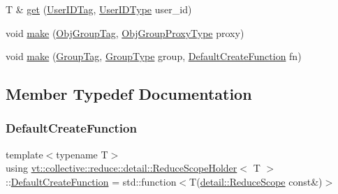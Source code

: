 \begin{DoxyCompactItemize}
\item 
T \& \hyperlink{structvt_1_1collective_1_1reduce_1_1detail_1_1_reduce_scope_holder_a2413b5fd1fbd0b87b09d81240000e5f8}{get} (\hyperlink{structvt_1_1collective_1_1reduce_1_1detail_1_1_reduce_scope_holder_1_1_user_i_d_tag}{User\+I\+D\+Tag}, \hyperlink{namespacevt_1_1collective_1_1reduce_1_1detail_ae82d7b96b0885b9b7dfb0104398beead}{User\+I\+D\+Type} user\+\_\+id)
\item 
void \hyperlink{structvt_1_1collective_1_1reduce_1_1detail_1_1_reduce_scope_holder_a0226c973a9bc67754fe5ce3076cb077e}{make} (\hyperlink{structvt_1_1collective_1_1reduce_1_1detail_1_1_reduce_scope_holder_1_1_obj_group_tag}{Obj\+Group\+Tag}, \hyperlink{namespacevt_ad7cae989df485fccca57f0792a880a8e}{Obj\+Group\+Proxy\+Type} proxy)
\item 
void \hyperlink{structvt_1_1collective_1_1reduce_1_1detail_1_1_reduce_scope_holder_a47ef025fc658370a2d42680f7c006abb}{make} (\hyperlink{structvt_1_1collective_1_1reduce_1_1detail_1_1_reduce_scope_holder_1_1_group_tag}{Group\+Tag}, \hyperlink{namespacevt_a27b5e4411c9b6140c49100e050e2f743}{Group\+Type} group, \hyperlink{structvt_1_1collective_1_1reduce_1_1detail_1_1_reduce_scope_holder_ac1bca1874a023b11bdc3c26b165c3b20}{Default\+Create\+Function} fn)
\end{DoxyCompactItemize}


\subsection{Member Typedef Documentation}
\mbox{\label{structvt_1_1collective_1_1reduce_1_1detail_1_1_reduce_scope_holder_ac1bca1874a023b11bdc3c26b165c3b20}} 
\subsubsection{\texorpdfstring{Default\+Create\+Function}{DefaultCreateFunction}}
{\footnotesize\ttfamily template$<$typename T$>$ \\
using \hyperlink{structvt_1_1collective_1_1reduce_1_1detail_1_1_reduce_scope_holder}{vt\+::collective\+::reduce\+::detail\+::\+Reduce\+Scope\+Holder}$<$ T $>$\+::\hyperlink{structvt_1_1collective_1_1reduce_1_1detail_1_1_reduce_scope_holder_ac1bca1874a023b11bdc3c26b165c3b20}{Default\+Create\+Function} =  std\+::function$<$T(\hyperlink{structvt_1_1collective_1_1reduce_1_1detail_1_1_reduce_scope}{detail\+::\+Reduce\+Scope} const\&)$>$}



